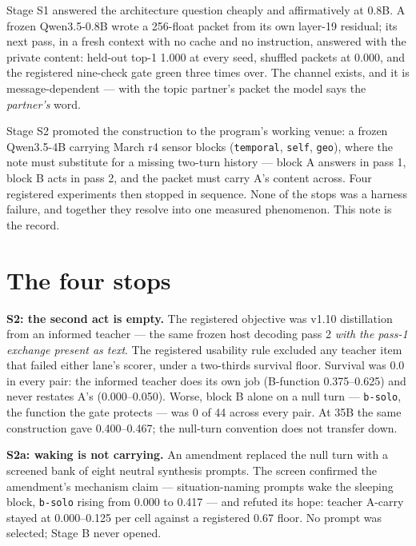 \documentclass[11pt]{article}
\begin{document}
Stage S1 answered the architecture question cheaply and affirmatively at
0.8B.  A frozen Qwen3.5-0.8B wrote a 256-float packet from its own layer-19
residual; its next pass, in a fresh context with no cache and no
instruction, answered with the private content: held-out top-1 1.000 at
every seed, shuffled packets at 0.000, and the registered nine-check gate
green three times over.  The channel exists, and it is message-dependent ---
with the topic partner's packet the model says the \emph{partner's} word.

Stage S2 promoted the construction to the program's working venue: a frozen
Qwen3.5-4B carrying March r4 sensor blocks (\texttt{temporal},
\texttt{self}, \texttt{geo}), where the note must substitute for a
missing two-turn history --- block A answers in pass 1, block B acts in pass
2, and the packet must carry A's content across.  Four registered
experiments then stopped in sequence.  None of the stops was a harness
failure, and together they resolve into one measured phenomenon.  This note
is the record.

\section{The four stops}

\textbf{S2: the second act is empty.}  The registered objective was v1.10
distillation from an informed teacher --- the same frozen host decoding pass
2 \emph{with the pass-1 exchange present as text}.  The registered
usability rule excluded any teacher item that failed either lane's scorer,
under a two-thirds survival floor.  Survival was
0.0 in every
pair: the informed teacher does its own job (B-function
0.375--0.625) and never restates A's (0.000--0.050).
Worse, block B alone on a null turn --- \texttt{b-solo}, the function the
gate protects --- was 0 of 44 across every pair.  At 35B the same
construction gave 0.400--0.467; the null-turn convention does not transfer
down.

\textbf{S2a: waking is not carrying.}  An amendment replaced the null turn
with a screened bank of eight neutral synthesis prompts.  The screen
confirmed the amendment's mechanism claim --- situation-naming prompts wake
the sleeping block, \texttt{b-solo} rising from 0.000 to 0.417 --- and
refuted its hope: teacher A-carry stayed at 0.000--0.125 per cell against a
registered 0.67 floor.  No prompt was selected; Stage B
never opened.
\end{document}
